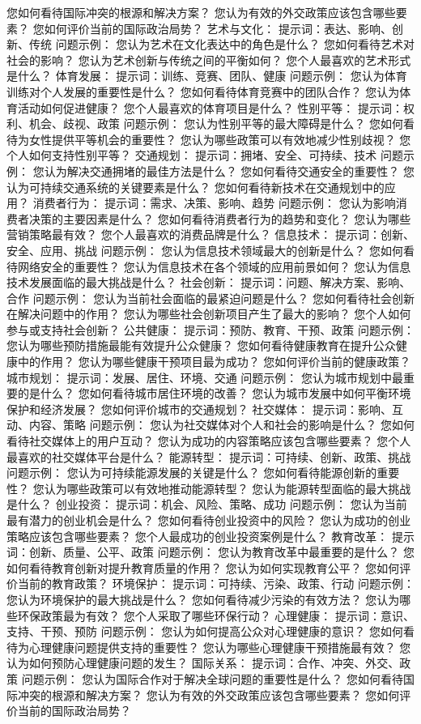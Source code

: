 \documentclass[12pt]{book}
\begin{document}
您如何看待国际冲突的根源和解决方案？
您认为有效的外交政策应该包含哪些要素？
您如何评价当前的国际政治局势？
艺术与文化：
提示词：表达、影响、创新、传统
问题示例：
您认为艺术在文化表达中的角色是什么？
您如何看待艺术对社会的影响？
您认为艺术创新与传统之间的平衡如何？
您个人最喜欢的艺术形式是什么？
体育发展：
提示词：训练、竞赛、团队、健康
问题示例：
您认为体育训练对个人发展的重要性是什么？
您如何看待体育竞赛中的团队合作？
您认为体育活动如何促进健康？
您个人最喜欢的体育项目是什么？
性别平等：
提示词：权利、机会、歧视、政策
问题示例：
您认为性别平等的最大障碍是什么？
您如何看待为女性提供平等机会的重要性？
您认为哪些政策可以有效地减少性别歧视？
您个人如何支持性别平等？
交通规划：
提示词：拥堵、安全、可持续、技术
问题示例：
您认为解决交通拥堵的最佳方法是什么？
您如何看待交通安全的重要性？
您认为可持续交通系统的关键要素是什么？
您如何看待新技术在交通规划中的应用？
消费者行为：
提示词：需求、决策、影响、趋势
问题示例：
您认为影响消费者决策的主要因素是什么？
您如何看待消费者行为的趋势和变化？
您认为哪些营销策略最有效？
您个人最喜欢的消费品牌是什么？
信息技术：
提示词：创新、安全、应用、挑战
问题示例：
您认为信息技术领域最大的创新是什么？
您如何看待网络安全的重要性？
您认为信息技术在各个领域的应用前景如何？
您认为信息技术发展面临的最大挑战是什么？
社会创新：
提示词：问题、解决方案、影响、合作
问题示例：
您认为当前社会面临的最紧迫问题是什么？
您如何看待社会创新在解决问题中的作用？
您认为哪些社会创新项目产生了最大的影响？
您个人如何参与或支持社会创新？
公共健康：
提示词：预防、教育、干预、政策
问题示例：
您认为哪些预防措施最能有效提升公众健康？
您如何看待健康教育在提升公众健康中的作用？
您认为哪些健康干预项目最为成功？
您如何评价当前的健康政策？
城市规划：
提示词：发展、居住、环境、交通
问题示例：
您认为城市规划中最重要的是什么？
您如何看待城市居住环境的改善？
您认为城市发展中如何平衡环境保护和经济发展？
您如何评价城市的交通规划？
社交媒体：
提示词：影响、互动、内容、策略
问题示例：
您认为社交媒体对个人和社会的影响是什么？
您如何看待社交媒体上的用户互动？
您认为成功的内容策略应该包含哪些要素？
您个人最喜欢的社交媒体平台是什么？
能源转型：
提示词：可持续、创新、政策、挑战
问题示例：
您认为可持续能源发展的关键是什么？
您如何看待能源创新的重要性？
您认为哪些政策可以有效地推动能源转型？
您认为能源转型面临的最大挑战是什么？
创业投资：
提示词：机会、风险、策略、成功
问题示例：
您认为当前最有潜力的创业机会是什么？
您如何看待创业投资中的风险？
您认为成功的创业策略应该包含哪些要素？
您个人最成功的创业投资案例是什么？
教育改革：
提示词：创新、质量、公平、政策
问题示例：
您认为教育改革中最重要的是什么？
您如何看待教育创新对提升教育质量的作用？
您认为如何实现教育公平？
您如何评价当前的教育政策？
环境保护：
提示词：可持续、污染、政策、行动
问题示例：
您认为环境保护的最大挑战是什么？
您如何看待减少污染的有效方法？
您认为哪些环保政策最为有效？
您个人采取了哪些环保行动？
心理健康：
提示词：意识、支持、干预、预防
问题示例：
您认为如何提高公众对心理健康的意识？
您如何看待为心理健康问题提供支持的重要性？
您认为哪些心理健康干预措施最有效？
您认为如何预防心理健康问题的发生？
国际关系：
提示词：合作、冲突、外交、政策
问题示例：
您认为国际合作对于解决全球问题的重要性是什么？
您如何看待国际冲突的根源和解决方案？
您认为有效的外交政策应该包含哪些要素？
您如何评价当前的国际政治局势？
\end{document}
